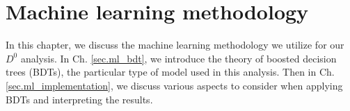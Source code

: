 \chapter{Machine learning methodology}
\label{ch.ml}

In this chapter, we discuss the machine learning methodology we utilize for our $D^0$ analysis. In Ch. \ref{sec.ml_bdt}, we introduce the theory of boosted decision trees (BDTs), the particular type of model used in this analysis. Then in Ch. \ref{sec.ml_implementation}, we discuss various aspects to consider when applying BDTs and interpreting the results.








